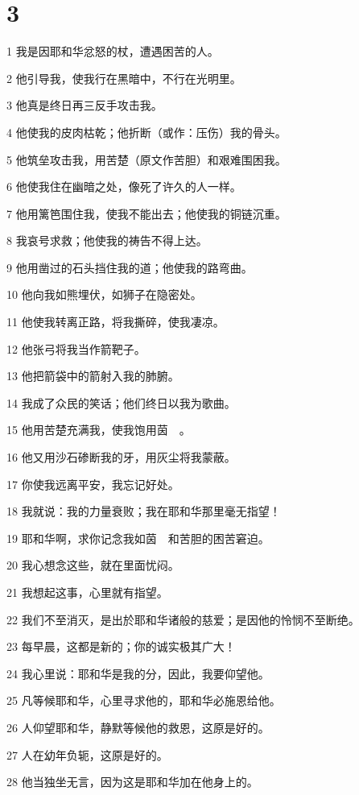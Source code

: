 \chapter{3}

\par 1 我是因耶和华忿怒的杖，遭遇困苦的人。
\par 2 他引导我，使我行在黑暗中，不行在光明里。
\par 3 他真是终日再三反手攻击我。
\par 4 他使我的皮肉枯乾；他折断（或作：压伤）我的骨头。
\par 5 他筑垒攻击我，用苦楚（原文作苦胆）和艰难围困我。
\par 6 他使我住在幽暗之处，像死了许久的人一样。
\par 7 他用篱笆围住我，使我不能出去；他使我的铜链沉重。
\par 8 我哀号求救；他使我的祷告不得上达。
\par 9 他用凿过的石头挡住我的道；他使我的路弯曲。
\par 10 他向我如熊埋伏，如狮子在隐密处。
\par 11 他使我转离正路，将我撕碎，使我凄凉。
\par 12 他张弓将我当作箭靶子。
\par 13 他把箭袋中的箭射入我的肺腑。
\par 14 我成了众民的笑话；他们终日以我为歌曲。
\par 15 他用苦楚充满我，使我饱用茵　。
\par 16 他又用沙石碜断我的牙，用灰尘将我蒙蔽。
\par 17 你使我远离平安，我忘记好处。
\par 18 我就说：我的力量衰败；我在耶和华那里毫无指望！
\par 19 耶和华啊，求你记念我如茵　和苦胆的困苦窘迫。
\par 20 我心想念这些，就在里面忧闷。
\par 21 我想起这事，心里就有指望。
\par 22 我们不至消灭，是出於耶和华诸般的慈爱；是因他的怜悯不至断绝。
\par 23 每早晨，这都是新的；你的诚实极其广大！
\par 24 我心里说：耶和华是我的分，因此，我要仰望他。
\par 25 凡等候耶和华，心里寻求他的，耶和华必施恩给他。
\par 26 人仰望耶和华，静默等候他的救恩，这原是好的。
\par 27 人在幼年负轭，这原是好的。
\par 28 他当独坐无言，因为这是耶和华加在他身上的。
